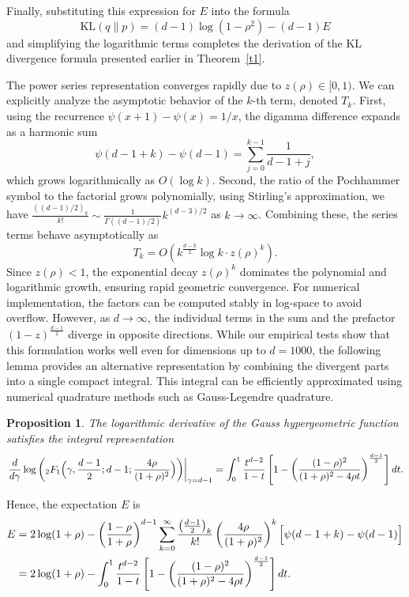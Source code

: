 \documentclass{article}
\newtheorem{prop}{Proposition}
\begin{document}
Finally, substituting this expression for \(E\) into the formula
\[
\mathrm{KL}(q\|p) = (d-1)\log(1-\rho^2) - (d-1)E
\]
and simplifying the logarithmic terms completes the derivation of the KL divergence formula presented earlier in Theorem~\ref{t1}.


The power series representation converges rapidly due to \(z(\rho) \in [0,1)\). We can explicitly analyze the asymptotic behavior of the \(k\)-th term, denoted \(T_k\). First, using the recurrence \(\psi(x+1)-\psi(x) = 1/x\), the digamma difference expands as a harmonic sum
\[
\psi(d-1+k) - \psi(d-1) = \sum_{j=0}^{k-1} \frac{1}{d-1+j},
\]
which grows logarithmically as \(O(\log k)\). Second, the ratio of the Pochhammer symbol to the factorial grows polynomially, using Stirling's approximation, we have \(\frac{((d-1)/2)_k}{k!} \sim \frac{1}{\Gamma((d-1)/2)} k^{(d-3)/2}\) as \(k \to \infty\). Combining these, the series terms behave asymptotically as
\[
T_k = O\left( k^{\frac{d-3}{2}} \log k \cdot z(\rho)^k \right).
\]
Since \(z(\rho) < 1\), the exponential decay \(z(\rho)^k\) dominates the polynomial and logarithmic growth, ensuring rapid geometric convergence.
For numerical implementation, the factors can be computed stably in log-space to avoid overflow. However, as \( d \to \infty \), the individual terms in the sum and the prefactor \(\left(1 - z\right)^{\frac{d-1}{2}}\) diverge in opposite directions. While our empirical tests show that this formulation works well even for dimensions up to \( d = 1000 \), the following lemma provides an alternative representation by combining the divergent parts into a single compact integral. This integral can be efficiently approximated using numerical quadrature methods such as Gauss-Legendre quadrature.

\begin{prop}\label{p1}
The logarithmic derivative of the Gauss hypergeometric function satisfies the integral representation
\begin{equation}
    \left.\frac{d}{d\gamma}\log\left( {}_2F_1\Bigl(\gamma,\frac{d-1}{2}; d-1; \frac{4\rho}{(1+\rho)^2}\Bigr)\right)\right|_{\gamma=d-1} 
    = \int_0^1 \frac{t^{d-2}}{1-t} \left[1 - \left(\frac{(1 -\rho)^2}{(1+\rho)^2 - 4 \rho t}\right)^{\frac{d-1}{2}} \right] dt.
\end{equation}
\end{prop}


Hence, the expectation $E$ is 
\begin{align}
\begin{split}
E &= 2\log(1+\rho) - \left(\frac{1-\rho}{1+\rho}\right)^{d-1} \sum_{k=0}^{\infty}\frac{\left(\frac{d-1}{2}\right)_k}{k!}\left(\frac{4\rho}{(1+\rho)^2}\right)^k \Bigl[\psi(d-1+k)-\psi(d-1)\Bigr]\\
 &= 2\log(1+\rho) - \int_0^1 \frac{t^{d-2}}{1-t} \left[1 - \left(\frac{(1 -\rho)^2}{(1+\rho)^2 - 4 \rho t}\right)^{\frac{d-1}{2}} \right] dt.
 \end{split}
\end{align}
\end{document}
